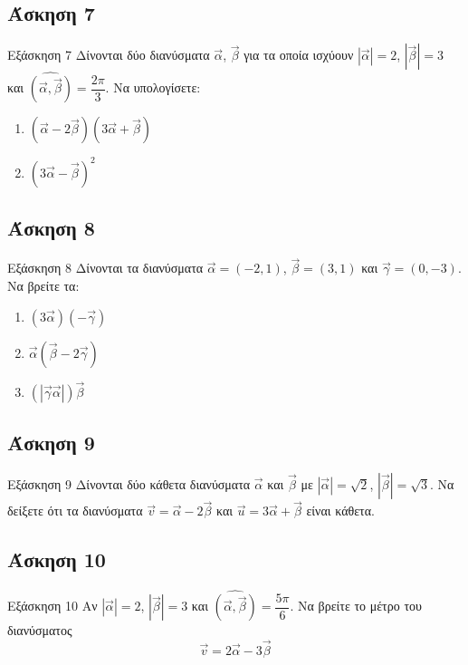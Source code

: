 \documentclass[greek]{beamer}
\begin{document}
\subsection{Άσκηση 7}
\begin{frame}[label=Άσκηση7,t]{Εξάσκηση 7}
      Δίνονται δύο διανύσματα $\vec{α}$, $\vec{β}$ για τα οποία ισχύουν $|\vec{α}|=2$, $|\vec{β}|=3$ και $\widehat{(\vec{α }, \vec{β })}=\dfrac{2\pi}{3}$. Να υπολογίσετε:
      \begin{enumerate}
            \item<1-> $(\vec{α}-2\vec{β})(3\vec{α}+\vec{β})$
            \item<2-> $(3\vec{α}-\vec{β})^2$
      \end{enumerate}

\end{frame}

\subsection{Άσκηση 8}
\begin{frame}[label=Άσκηση8,t]{Εξάσκηση 8}
      Δίνονται τα διανύσματα $\vec{α}=(-2,1)$, $\vec{β}=(3,1)$ και $\vec{γ}=(0,-3)$. Να βρείτε τα:

      \begin{enumerate}
            \item<1-> $(3\vec{α})(-\vec{γ})$
            \item<2-> $\vec{α}(\vec{β}-2\vec{γ})$
            \item<3-> $(|\vec{γ}\vec{α}|)\vec{β}$
      \end{enumerate}

\end{frame}

\subsection{Άσκηση 9}
\begin{frame}[label=Άσκηση9,t]{Εξάσκηση 9}
      Δίνονται δύο κάθετα διανύσματα $\vec{α}$ και $\vec{β}$ με $|\vec{α}|=\sqrt{2}$, $|\vec{β}|=\sqrt{3}$. Να δείξετε ότι τα διανύσματα $\vec{v}=\vec{α}-2\vec{β}$ και $\vec{u}=3\vec{α}+\vec{β}$ είναι κάθετα.
\end{frame}

\subsection{Άσκηση 10}
\begin{frame}[label=Άσκηση10,t]{Εξάσκηση 10}
      Αν $|\vec{α}|=2$, $|\vec{β}|=3$ και $\widehat{(\vec{α }, \vec{β })}=\dfrac{5\pi}{6}$. Να βρείτε το μέτρο του διανύσματος
      $$\vec{v}=2\vec{α}-3\vec{β}$$
\end{frame}
\end{document}
